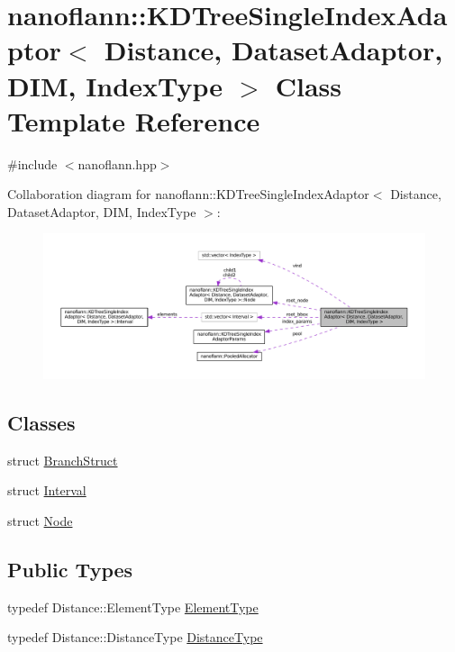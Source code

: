 \hypertarget{classnanoflann_1_1_k_d_tree_single_index_adaptor}{\section{nanoflann\-:\-:K\-D\-Tree\-Single\-Index\-Adaptor$<$ Distance, Dataset\-Adaptor, D\-I\-M, Index\-Type $>$ Class Template Reference}
\label{classnanoflann_1_1_k_d_tree_single_index_adaptor}
}


{\ttfamily \#include $<$nanoflann.\-hpp$>$}



Collaboration diagram for nanoflann\-:\-:K\-D\-Tree\-Single\-Index\-Adaptor$<$ Distance, Dataset\-Adaptor, D\-I\-M, Index\-Type $>$\-:
\nopagebreak
\begin{figure}[H]
\begin{center}
\leavevmode
\includegraphics[width=350pt]{classnanoflann_1_1_k_d_tree_single_index_adaptor__coll__graph}
\end{center}
\end{figure}
\subsection*{Classes}
\begin{DoxyCompactItemize}
\item 
struct \hyperlink{structnanoflann_1_1_k_d_tree_single_index_adaptor_1_1_branch_struct}{Branch\-Struct}
\item 
struct \hyperlink{structnanoflann_1_1_k_d_tree_single_index_adaptor_1_1_interval}{Interval}
\item 
struct \hyperlink{structnanoflann_1_1_k_d_tree_single_index_adaptor_1_1_node}{Node}
\end{DoxyCompactItemize}
\subsection*{Public Types}
\begin{DoxyCompactItemize}
\item 
typedef Distance\-::\-Element\-Type \hyperlink{classnanoflann_1_1_k_d_tree_single_index_adaptor_a21652a3919382d558291f80cefad8770}{Element\-Type}
\item 
typedef Distance\-::\-Distance\-Type \hyperlink{classnanoflann_1_1_k_d_tree_single_index_adaptor_addc764e7c19cc85c89b3903338e5a910}{Distance\-Type}
\end{DoxyCompactItemize}
